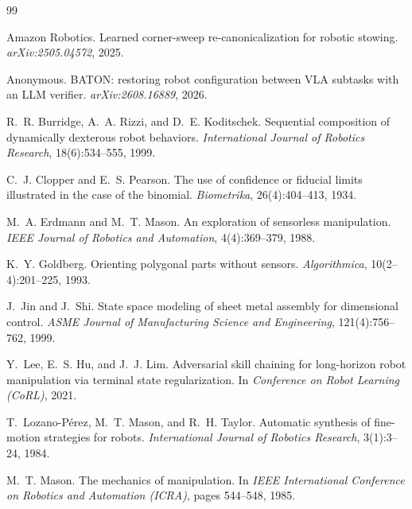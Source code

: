 \documentclass[11pt]{article}
\begin{document}
\begin{thebibliography}{99}

Amazon Robotics.
\newblock Learned corner-sweep re-canonicalization for robotic stowing.
\newblock \emph{arXiv:2505.04572}, 2025.

Anonymous.
\newblock BATON: restoring robot configuration between VLA subtasks with an
LLM verifier.
\newblock \emph{arXiv:2608.16889}, 2026.

R.~R. Burridge, A.~A. Rizzi, and D.~E. Koditschek.
\newblock Sequential composition of dynamically dexterous robot behaviors.
\newblock \emph{International Journal of Robotics Research}, 18(6):534--555,
1999.

C.~J. Clopper and E.~S. Pearson.
\newblock The use of confidence or fiducial limits illustrated in the case
of the binomial.
\newblock \emph{Biometrika}, 26(4):404--413, 1934.

M.~A. Erdmann and M.~T. Mason.
\newblock An exploration of sensorless manipulation.
\newblock \emph{IEEE Journal of Robotics and Automation}, 4(4):369--379,
1988.

K.~Y. Goldberg.
\newblock Orienting polygonal parts without sensors.
\newblock \emph{Algorithmica}, 10(2--4):201--225, 1993.

J.~Jin and J.~Shi.
\newblock State space modeling of sheet metal assembly for dimensional
control.
\newblock \emph{ASME Journal of Manufacturing Science and Engineering},
121(4):756--762, 1999.

Y.~Lee, E.~S. Hu, and J.~J. Lim.
\newblock Adversarial skill chaining for long-horizon robot manipulation via
terminal state regularization.
\newblock In \emph{Conference on Robot Learning (CoRL)}, 2021.

T.~Lozano-P\'{e}rez, M.~T. Mason, and R.~H. Taylor.
\newblock Automatic synthesis of fine-motion strategies for robots.
\newblock \emph{International Journal of Robotics Research}, 3(1):3--24,
1984.

M.~T. Mason.
\newblock The mechanics of manipulation.
\newblock In \emph{IEEE International Conference on Robotics and Automation
(ICRA)}, pages 544--548, 1985.


\end{thebibliography}
\end{document}

